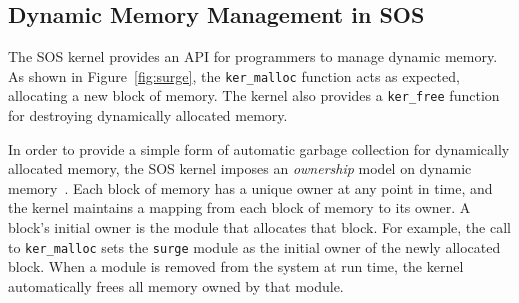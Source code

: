 \subsection{Dynamic Memory Management in SOS}

The SOS kernel provides an API for programmers to manage
dynamic memory.  As shown in Figure~\ref{fig:surge}, the
{\tt ker\_malloc} function acts as expected, allocating a new block of
memory.  The kernel also provides a {\tt ker\_free} function for
destroying dynamically allocated memory.

In order to provide a simple form of automatic
garbage collection for dynamically allocated memory, the SOS kernel
imposes an {\em ownership}
model on dynamic memory~\cite{sos}.  Each block of memory
has a unique owner at any point in time, and the kernel maintains a mapping
from each block of memory to its owner.  A block's initial owner is
the module that allocates that block.  For example,
the call to {\tt ker\_malloc} sets the {\tt surge}
module as the initial owner of the newly allocated block.
When a module is removed from the system at run time, the
kernel automatically frees all memory owned by that module.



%

